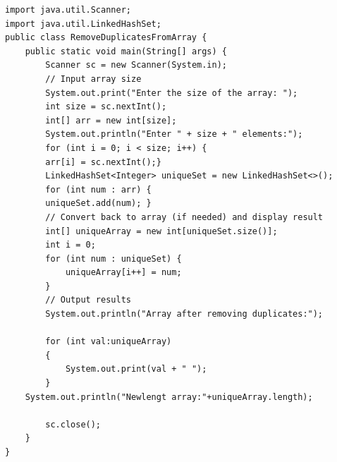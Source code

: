 \begin{verbatim}
import java.util.Scanner;
import java.util.LinkedHashSet;
public class RemoveDuplicatesFromArray {
    public static void main(String[] args) {
        Scanner sc = new Scanner(System.in);
        // Input array size
        System.out.print("Enter the size of the array: ");
        int size = sc.nextInt();
        int[] arr = new int[size];
        System.out.println("Enter " + size + " elements:");
        for (int i = 0; i < size; i++) {
        arr[i] = sc.nextInt();}
        LinkedHashSet<Integer> uniqueSet = new LinkedHashSet<>();
        for (int num : arr) {
        uniqueSet.add(num); }
        // Convert back to array (if needed) and display result
        int[] uniqueArray = new int[uniqueSet.size()];
        int i = 0;
        for (int num : uniqueSet) {
            uniqueArray[i++] = num;
        }
        // Output results
        System.out.println("Array after removing duplicates:");
        
        for (int val:uniqueArray)
        {
            System.out.print(val + " ");
        }
    System.out.println("Newlengt array:"+uniqueArray.length);

        sc.close();
    }
}

\end{verbatim}